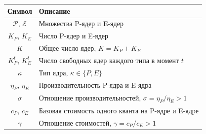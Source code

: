 \documentclass[14pt, oneside]{extbook}
\begin{document}
\vspace{1em}
\noindent\begin{minipage}{\textwidth}
\centering
{}
\label{tab:notation_platform}
\vspace{0.4em}
\begin{tabular}{|c|p{11cm}|}
        \hline
        \textbf{Символ} & \textbf{Описание} \\
        \hline
        $\mathcal{P}$, $\mathcal{E}$ & Множества
              P-ядер и E-ядер \\
        $K_P$, $K_E$ & Число P-ядер и E-ядер \\
        $K$ & Общее число ядер, $K = K_P + K_E$ \\
        $K_P^t$, $K_E^t$ & Число свободных ядер
              каждого типа в момент $t$ \\
        $\kappa$ & Тип ядра, $\kappa \in \{P, E\}$ \\
        $\eta_P$, $\eta_E$ & Производительность
              P-ядра и E-ядра \\
        $\sigma$ & Отношение производительностей,
              $\sigma = \eta_P / \eta_E > 1$ \\
        $c_P$, $c_E$ & Базовая стоимость одного
              кванта на P-ядре и E-ядре \\
        $\gamma$ & Отношение стоимостей,
              $\gamma = c_P / c_E > 1$ \\
        \hline
\end{tabular}
\end{minipage}
\end{document}
